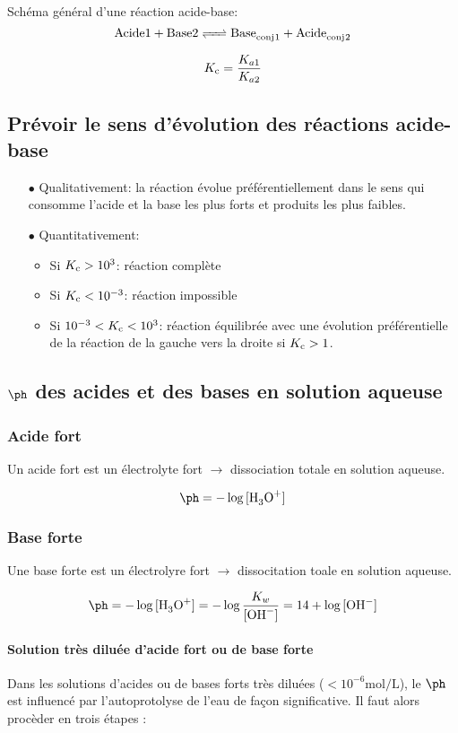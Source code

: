 Schéma général d'une réaction acide-base:
\[ \ce{Acide 1 + Base 2 <=> Base_{conj}1 + Acide_{conj}2} \]

$$K_{\mathrm{c}}=\frac{K_{a1}}{K_{a2}}$$

\subsection{Prévoir le sens d'évolution des réactions acide-base}

\begin{itemize}
  \item[$\bullet$] Qualitativement: la réaction évolue préférentiellement dans le sens qui consomme l'acide et la base les plus forts et produits les plus faibles.
  \item[$\bullet$] Quantitativement:
    \begin{itemize}
      \item Si $K_{\mathrm{c}}>10^3$: réaction complète
      \item Si $K_{\mathrm{c}}<10^{-3}$: réaction impossible
      \item Si $10^{-3}<K_{\mathrm{c}}<10^3$: réaction équilibrée avec une évolution
        préférentielle de la réaction de la gauche vers la droite si $K_{\mathrm{c}}>1$.
    \end{itemize}
\end{itemize}

\subsection{$\ph$ des acides et des bases en solution aqueuse}

\subsubsection{Acide fort}
Un acide fort est un électrolyte fort $\rightarrow$ dissociation totale
en solution aqueuse.

\[ \ph = -\log{[\ce{H3O+}]} \]

\subsubsection{Base forte}
Une base forte est un électrolyre fort $\rightarrow$ dissocitation toale
en solution aqueuse.

\[ \ph = -\log{[\ce{H3O+}]} = -\log{\frac{K_w}{[\ce{OH-}]}} = 14 + \log{[\ce{OH-}]} \]

\paragraph{Solution très diluée d'acide fort ou de base forte}
Dans les solutions d'acides ou de bases forts très diluées ($<10^{-6} \unit{\mole\per\liter}$),
le $\ph$ est influencé par l'autoprotolyse de l'eau de façon significative. Il faut alors procèder
en trois étapes\cite[p.~464]{atkins2011principes} :

